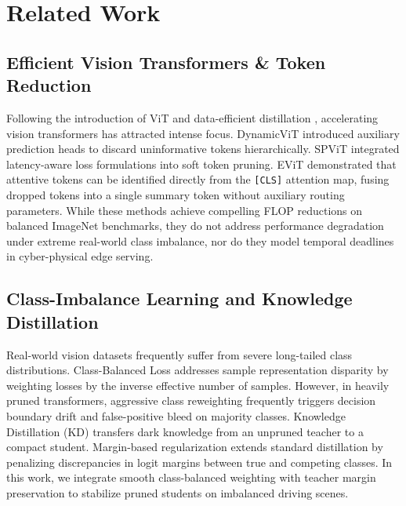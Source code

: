 \documentclass[conference]{IEEEtran}
\begin{document}
\section{Related Work}

\subsection{Efficient Vision Transformers \& Token Reduction}
Following the introduction of ViT \cite{dosovitskiy2021image} and data-efficient distillation \cite{touvron2021training}, accelerating vision transformers has attracted intense focus. DynamicViT \cite{rao2021dynamicvit} introduced auxiliary prediction heads to discard uninformative tokens hierarchically. SPViT \cite{kong2022spvit} integrated latency-aware loss formulations into soft token pruning. EViT \cite{liang2022not} demonstrated that attentive tokens can be identified directly from the \texttt{[CLS]} attention map, fusing dropped tokens into a single summary token without auxiliary routing parameters. While these methods achieve compelling FLOP reductions on balanced ImageNet benchmarks, they do not address performance degradation under extreme real-world class imbalance, nor do they model temporal deadlines in cyber-physical edge serving.

\subsection{Class-Imbalance Learning and Knowledge Distillation}
Real-world vision datasets frequently suffer from severe long-tailed class distributions. Class-Balanced Loss \cite{cui2019class} addresses sample representation disparity by weighting losses by the inverse effective number of samples. However, in heavily pruned transformers, aggressive class reweighting frequently triggers decision boundary drift and false-positive bleed on majority classes. Knowledge Distillation (KD) \cite{hinton2015distilling, touvron2021training} transfers dark knowledge from an unpruned teacher to a compact student. Margin-based regularization extends standard distillation by penalizing discrepancies in logit margins between true and competing classes. In this work, we integrate smooth class-balanced weighting with teacher margin preservation to stabilize pruned students on imbalanced driving scenes.
\end{document}
